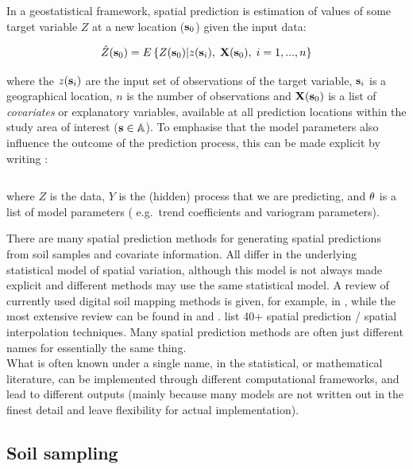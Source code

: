 \documentclass[11pt]{krantz}
\theoremstyle{definition}
\theoremstyle{definition}
\theoremstyle{definition}
\theoremstyle{remark}
\begin{document}
In a geostatistical framework, spatial prediction is estimation of
values of some target variable \(Z\) at a new location (\({\bf{s}}_0\))
given the input data:

\begin{equation}
\hat Z({\bf{s}}_0) = E\left\{ Z({\bf{s}}_0)|z({\bf{s}}_i), \; {\bf{X}}({\bf{s}}_0), \; i=1,...,n \right\}
\label{eq:sp}
\end{equation}

where the \(z({\bf{s}}_i)\) are the input set of observations of the
target variable, \({\bf{s}}_i\) is a geographical location, \(n\) is the
number of observations and \({\bf{X}}({\bf{s}}_0)\) is a list of
\emph{covariates} or explanatory variables, available at all prediction
locations within the study area of interest
(\({\bf{s}} \in \mathbb{A}\)). To emphasise that the model parameters
also influence the outcome of the prediction process, this can be made
explicit by writing \citep{cressie2011statistics}:

\begin{equation}
[Z|Y,{\bf{\theta}} ]
\label{eq:datamodel}
\end{equation}

where \(Z\) is the data, \(Y\) is the (hidden) process that we are
predicting, and \({\bf{\theta}}\) is a list of model parameters (
e.g.~trend coefficients and variogram parameters).

There are many spatial prediction methods for generating spatial
predictions from soil samples and covariate information. All differ in
the underlying statistical model of spatial variation, although this
model is not always made explicit and different methods may use the same
statistical model. A review of currently used digital soil mapping
methods is given, for example, in \citet{McBratney2011HSS}, while the
most extensive review can be found in \citet{McBratney2003Geoderma} and
\citet{mcbratney2018pedometrics}. \citet{LiHeap2010EI} list 40+ spatial
prediction / spatial interpolation techniques. Many spatial prediction
methods are often just different names for essentially the same thing.\\
What is often known under a single name, in the statistical, or
mathematical literature, can be implemented through different
computational frameworks, and lead to different outputs (mainly because
many models are not written out in the finest detail and leave
flexibility for actual implementation).

\hypertarget{soil-sampling}{%
\subsection{Soil sampling}\label{soil-sampling}}
\end{document}
